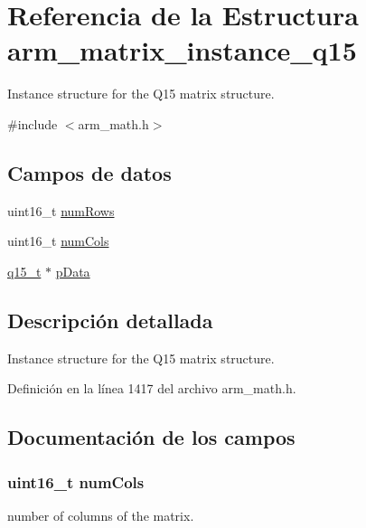 \hypertarget{structarm__matrix__instance__q15}{}\section{Referencia de la Estructura arm\+\_\+matrix\+\_\+instance\+\_\+q15}
\label{structarm__matrix__instance__q15}


Instance structure for the Q15 matrix structure.  




{\ttfamily \#include $<$arm\+\_\+math.\+h$>$}

\subsection*{Campos de datos}
\begin{DoxyCompactItemize}
\item 
uint16\+\_\+t \hyperlink{structarm__matrix__instance__q15_a1bcf80ccdc2acc29198f1592ae300390}{num\+Rows}
\item 
uint16\+\_\+t \hyperlink{structarm__matrix__instance__q15_a4bb5ec0d13eb4c9cf887aa8366a44117}{num\+Cols}
\item 
\hyperlink{arm__math_8h_ab5a8fb21a5b3b983d5f54f31614052ea}{q15\+\_\+t} $\ast$ \hyperlink{structarm__matrix__instance__q15_a817ede38365e63e561a12069c6c5c087}{p\+Data}
\end{DoxyCompactItemize}


\subsection{Descripción detallada}
Instance structure for the Q15 matrix structure. 

Definición en la línea 1417 del archivo arm\+\_\+math.\+h.



\subsection{Documentación de los campos}
\subsubsection[{\texorpdfstring{num\+Cols}{numCols}}]{\setlength{\rightskip}{0pt plus 5cm}uint16\+\_\+t num\+Cols}\hypertarget{structarm__matrix__instance__q15_a4bb5ec0d13eb4c9cf887aa8366a44117}{}\label{structarm__matrix__instance__q15_a4bb5ec0d13eb4c9cf887aa8366a44117}
number of columns of the matrix. 

